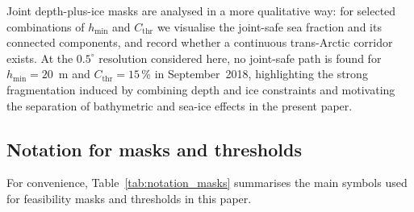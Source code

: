 Joint depth-plus-ice masks are analysed in a more qualitative way: for
selected combinations of $h_{\min}$ and $C_{\mathrm{thr}}$ we visualise
the joint-safe sea fraction and its connected components, and record
whether a continuous trans-Arctic corridor exists. At the
$0.5^{\circ}$ resolution considered here, no joint-safe path is found
for $h_{\min}=20$~m and $C_{\mathrm{thr}}=15$\,\% in September~2018,
highlighting the strong fragmentation induced by combining depth and
ice constraints and motivating the separation of bathymetric and
sea-ice effects in the present paper.

\subsection*{Notation for masks and thresholds}

For convenience, Table~\ref{tab:notation_masks} summarises the main
symbols used for feasibility masks and thresholds in this paper.


